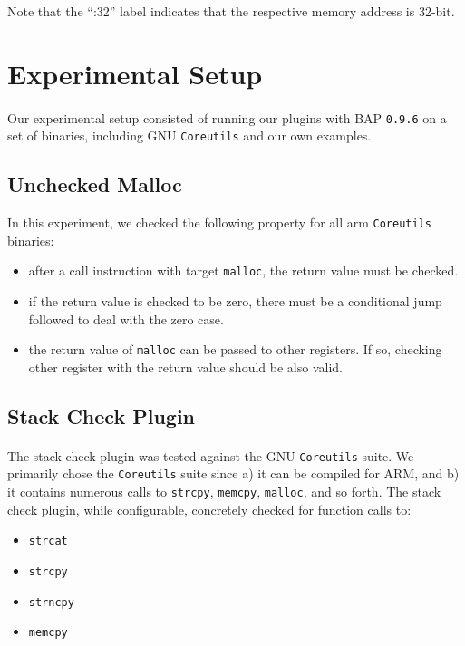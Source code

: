 \documentclass[letterpaper,11pt]{article}
\begin{document}
Note that the “:32” label indicates that the respective memory address is
32-bit.


\section{Experimental Setup}

\paragraph{}
Our experimental setup consisted of running our plugins with BAP \texttt{0.9.6}
\cite{bap} on a set of binaries, including GNU \texttt{Coreutils} and our
own examples.

\subsection{Unchecked Malloc}

In this experiment, we checked the following property for all arm
\texttt{Coreutils} binaries:
\begin{itemize}
\item after a call instruction with target \texttt{malloc}, the return value
    must be checked.
\item if the return value is checked to be zero, there must be a conditional
    jump followed to deal with the zero case.
\item the return value of \texttt{malloc} can be passed to other registers. If
    so, checking other register with the return value should be also valid.
\end{itemize}

\subsection{Stack Check Plugin}

\paragraph{}
The stack check plugin was tested against the GNU \texttt{Coreutils} suite. We
primarily chose the \texttt{Coreutils} suite since a) it can be compiled for
ARM, and b) it contains numerous calls to \texttt{strcpy}, \texttt{memcpy},
\texttt{malloc}, and so forth.  The stack check plugin, while configurable,
concretely checked for function calls to:

\begin{itemize}
  \item \texttt{strcat}
  \item \texttt{strcpy}
  \item \texttt{strncpy}
  \item \texttt{memcpy}
\end{itemize}
\end{document}
